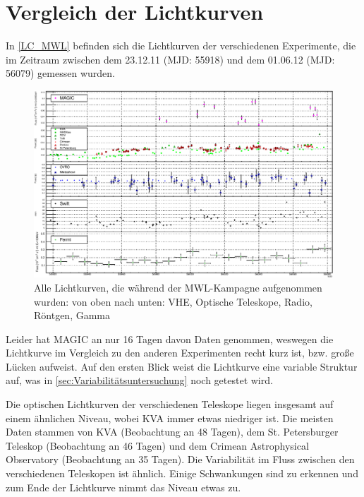 \section{Vergleich der Lichtkurven}
In \autoref{LC_MWL} befinden sich die Lichtkurven der verschiedenen Experimente, die im Zeitraum zwischen dem 23.12.11 (MJD: 55918) und dem 01.06.12 (MJD: 56079) gemessen wurden.

\begin{figure}
    \centering
    \includegraphics[width=1\linewidth]{./Plots/05_MWL/LC_final.pdf}
    \caption{Alle Lichtkurven, die während der MWL-Kampagne aufgenommen wurden: von oben nach unten: VHE, Optische Teleskope, Radio, Röntgen, Gamma}
    \label{LC_MWL}
\end{figure}

Leider hat MAGIC an nur 16 Tagen davon Daten genommen, weswegen die Lichtkurve im Vergleich zu den anderen Experimenten recht kurz ist, bzw. große Lücken aufweist.
Auf den ersten Blick weist die Lichtkurve eine variable Struktur auf, was in \autoref{sec:Variabilitätsuntersuchung} noch getestet wird.

Die optischen Lichtkurven der verschiedenen Teleskope liegen insgesamt auf einem ähnlichen Niveau, wobei KVA immer etwas niedriger ist.
Die meisten Daten stammen von KVA (Beobachtung an 48 Tagen), dem St. Petersburger Teleskop (Beobachtung an 46 Tagen) und dem Crimean Astrophysical Observatory (Beobachtung an 35 Tagen).
Die Variabilität im Fluss zwischen den verschiedenen Teleskopen ist ähnlich. 
Einige Schwankungen sind zu erkennen und zum Ende der Lichtkurve nimmt das Niveau etwas zu.

